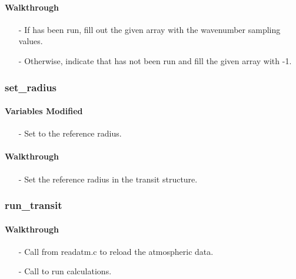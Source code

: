 \documentclass[letterpaper,12pt]{article}
\begin{document}
\paragraph{Walkthrough}
\begin{enumerate}[leftmargin=10pt, noitemsep, parsep=0pt, topsep=0ex]
\item[-] If  has been run, fill out the given array with the wavenumber sampling values.
\item[-] Otherwise, indicate that  has not been run and fill the given array with -1.
\end{enumerate}

\subsubsection{set\_radius}
\paragraph{Variables Modified}
\begin{enumerate}[leftmargin=10pt, noitemsep, parsep=0pt, topsep=0ex]
\item[-] Set  to the reference radius.
\end{enumerate}

\paragraph{Walkthrough}
\begin{enumerate}[leftmargin=10pt, noitemsep, parsep=0pt, topsep=0ex]
\item[-] Set the reference radius in the transit structure.
\end{enumerate}

\subsubsection{run\_transit}
\paragraph{Walkthrough}
\begin{enumerate}[leftmargin=10pt, noitemsep, parsep=0pt, topsep=0ex]
\item[-] Call  from readatm.c to reload the atmospheric data.
\item[-] Call  to run calculations.
\end{enumerate}
\end{document}

